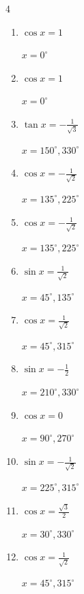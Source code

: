 \begin{multicols}{4}
\begin{enumerate}
  \item $\displaystyle \cos{x}  = 1$

        $\displaystyle x = 0^{\circ}$

  \item $\displaystyle \cos{x}  = 1$

        $\displaystyle x = 0^{\circ}$

  \item $\displaystyle \tan{x}  = -\frac{1}{\sqrt{3}}$

        $\displaystyle x = 150^{\circ} , 330^{\circ}$

  \item $\displaystyle \cos{x}  = -\frac{1}{\sqrt{2}}$

        $\displaystyle x = 135^{\circ} , 225^{\circ}$

  \item $\displaystyle \cos{x}  = -\frac{1}{\sqrt{2}}$

        $\displaystyle x = 135^{\circ} , 225^{\circ}$

  \item $\displaystyle \sin{x}  = \frac{1}{\sqrt{2}}$

        $\displaystyle x = 45^{\circ} , 135^{\circ}$

  \item $\displaystyle \cos{x}  = \frac{1}{\sqrt{2}}$

        $\displaystyle x = 45^{\circ} , 315^{\circ}$

  \item $\displaystyle \sin{x}  = -\frac{1}{2}$

        $\displaystyle x = 210^{\circ} , 330^{\circ}$

  \item $\displaystyle \cos{x}  = 0$

        $\displaystyle x = 90^{\circ} , 270^{\circ}$

  \item $\displaystyle \sin{x}  = -\frac{1}{\sqrt{2}}$

        $\displaystyle x = 225^{\circ} , 315^{\circ}$

  \item $\displaystyle \cos{x}  = \frac{\sqrt{3}}{2}$

        $\displaystyle x = 30^{\circ} , 330^{\circ}$

  \item $\displaystyle \cos{x}  = \frac{1}{\sqrt{2}}$

        $\displaystyle x = 45^{\circ} , 315^{\circ}$


\end{enumerate}
\end{multicols}
